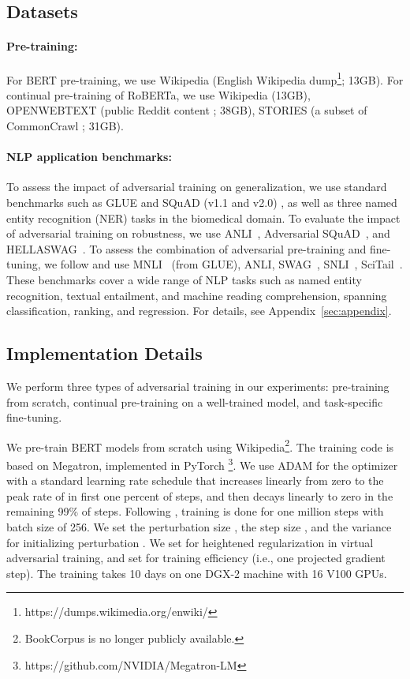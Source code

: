 \documentclass[11pt,a4paper]{article}
\begin{document}
\subsection{Datasets}
\label{subsec:dataset}
\paragraph{Pre-training:} For BERT pre-training, we use Wikipedia (English Wikipedia dump\footnote{https://dumps.wikimedia.org/enwiki/}; 13GB). For continual pre-training of RoBERTa, we use Wikipedia (13GB), OPENWEBTEXT (public Reddit content \cite{Gokaslan2019OpenWeb}; 38GB), STORIES (a subset of CommonCrawl \cite{trinh2018simple}; 31GB).


\paragraph{NLP application benchmarks:} 
To assess the impact of adversarial training on generalization, we use standard benchmarks such as GLUE \cite{wang2018glue} and SQuAD (v1.1 and v2.0) \cite{squad1,squad2}, as well as three named entity recognition (NER) tasks in the biomedical domain.
To evaluate the impact of adversarial training on robustness, we use ANLI~\cite{nie2019adversarial}, 
Adversarial SQuAD~\cite{jia2017advsquad}, and 
HELLASWAG~\cite{hampel1974influence}. 
To assess the combination of adversarial pre-training and fine-tuning, we follow  and use MNLI~\cite{mnli2018} (from GLUE), ANLI, SWAG~\cite{zellers2018swag}, SNLI~\cite{snli2015}, SciTail~\cite{scitail}. 
These benchmarks cover a wide range of NLP tasks such as named entity recognition, textual entailment, and machine reading comprehension, spanning classification, ranking, and regression. For details, see Appendix~\ref{sec:appendix}.

\subsection{Implementation Details}
\label{subsec:details}
We perform three types of adversarial training in our experiments: pre-training from scratch, continual pre-training on a well-trained model, and task-specific fine-tuning.

We pre-train BERT models from scratch using Wikipedia\footnote{BookCorpus is no longer publicly available.}. 
The training code is based on Megatron, implemented in PyTorch  \cite{shoeybi2019megatron}\footnote{https://github.com/NVIDIA/Megatron-LM}.  
We use ADAM \cite{kingma2014adam} for the optimizer with a standard learning rate schedule that increases linearly from zero to the peak rate of  in first one percent of steps, and then decays linearly to zero in the remaining 99\% of steps. 
Following \citet{devlin2018bert}, training is done for one million steps with batch size of 256.
We set the perturbation size , the step size , and the variance for initializing perturbation . 
We set  for heightened regularization in virtual adversarial training, and set  for training efficiency (i.e., one projected gradient step). 
The training takes 10 days on one DGX-2 machine with 16 V100 GPUs.
\end{document}
